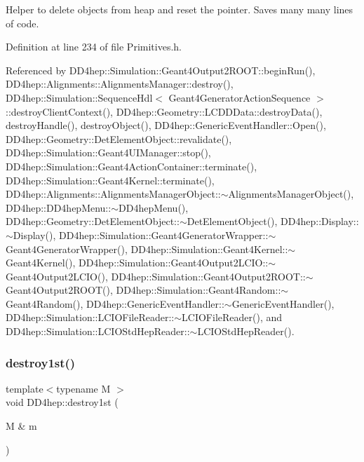 Helper to delete objects from heap and reset the pointer. Saves many many lines of code. 



Definition at line 234 of file Primitives.\+h.



Referenced by D\+D4hep\+::\+Simulation\+::\+Geant4\+Output2\+R\+O\+O\+T\+::begin\+Run(), D\+D4hep\+::\+Alignments\+::\+Alignments\+Manager\+::destroy(), D\+D4hep\+::\+Simulation\+::\+Sequence\+Hdl$<$ Geant4\+Generator\+Action\+Sequence $>$\+::destroy\+Client\+Context(), D\+D4hep\+::\+Geometry\+::\+L\+C\+D\+D\+Data\+::destroy\+Data(), destroy\+Handle(), destroy\+Object(), D\+D4hep\+::\+Generic\+Event\+Handler\+::\+Open(), D\+D4hep\+::\+Geometry\+::\+Det\+Element\+Object\+::revalidate(), D\+D4hep\+::\+Simulation\+::\+Geant4\+U\+I\+Manager\+::stop(), D\+D4hep\+::\+Simulation\+::\+Geant4\+Action\+Container\+::terminate(), D\+D4hep\+::\+Simulation\+::\+Geant4\+Kernel\+::terminate(), D\+D4hep\+::\+Alignments\+::\+Alignments\+Manager\+Object\+::$\sim$\+Alignments\+Manager\+Object(), D\+D4hep\+::\+D\+D4hep\+Menu\+::$\sim$\+D\+D4hep\+Menu(), D\+D4hep\+::\+Geometry\+::\+Det\+Element\+Object\+::$\sim$\+Det\+Element\+Object(), D\+D4hep\+::\+Display\+::$\sim$\+Display(), D\+D4hep\+::\+Simulation\+::\+Geant4\+Generator\+Wrapper\+::$\sim$\+Geant4\+Generator\+Wrapper(), D\+D4hep\+::\+Simulation\+::\+Geant4\+Kernel\+::$\sim$\+Geant4\+Kernel(), D\+D4hep\+::\+Simulation\+::\+Geant4\+Output2\+L\+C\+I\+O\+::$\sim$\+Geant4\+Output2\+L\+C\+I\+O(), D\+D4hep\+::\+Simulation\+::\+Geant4\+Output2\+R\+O\+O\+T\+::$\sim$\+Geant4\+Output2\+R\+O\+O\+T(), D\+D4hep\+::\+Simulation\+::\+Geant4\+Random\+::$\sim$\+Geant4\+Random(), D\+D4hep\+::\+Generic\+Event\+Handler\+::$\sim$\+Generic\+Event\+Handler(), D\+D4hep\+::\+Simulation\+::\+L\+C\+I\+O\+File\+Reader\+::$\sim$\+L\+C\+I\+O\+File\+Reader(), and D\+D4hep\+::\+Simulation\+::\+L\+C\+I\+O\+Std\+Hep\+Reader\+::$\sim$\+L\+C\+I\+O\+Std\+Hep\+Reader().

\hypertarget{namespace_d_d4hep_ad97ecff6ba06daf5d6dc7225dfad6361}{}\label{namespace_d_d4hep_ad97ecff6ba06daf5d6dc7225dfad6361} 
\subsubsection{\texorpdfstring{destroy1st()}{destroy1st()}}
{\footnotesize\ttfamily template$<$typename M $>$ \\
void D\+D4hep\+::destroy1st (\begin{DoxyParamCaption}\item[{M \&}]{m }\end{DoxyParamCaption})}



